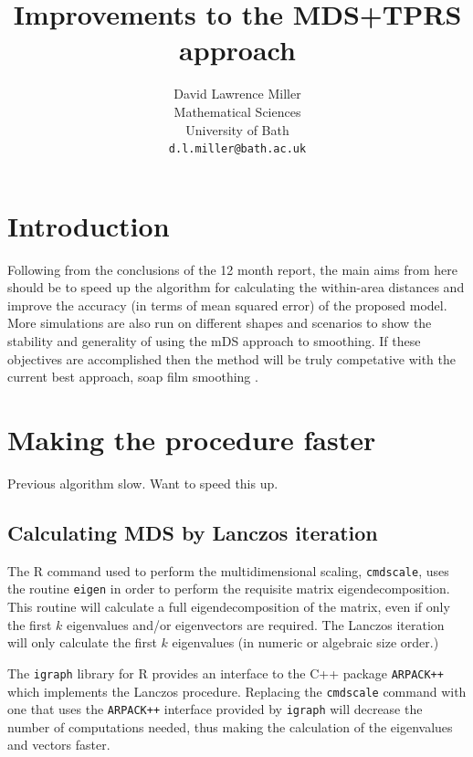 \documentclass[a4paper,10pt]{article}
\title{Improvements to the MDS+TPRS approach}
\author{David Lawrence Miller\\Mathematical Sciences\\University of Bath\\\texttt{d.l.miller@bath.ac.uk}}
\begin{document}
 
 
 
\newtheorem{thm}{Theorem}[section]
 
\newtheorem{defn}{Definition}[section]
 
\maketitle

\section{Introduction}

Following from the conclusions of the 12 month report, the main aims from here should be to speed up the algorithm for calculating the within-area distances and improve the accuracy (in terms of mean squared error) of the proposed model. More simulations are also run on different shapes and scenarios to show the stability and generality of using the mDS approach to smoothing. If these objectives are accomplished then the method will be truly competative with the current best approach, soap film smoothing \cite{soap}.


\section{Making the procedure faster}

Previous algorithm slow. Want to speed this up. 

\subsection{Calculating MDS by Lanczos iteration}

The \textsf{R} command used to perform the multidimensional scaling, \texttt{cmdscale}, uses the routine \texttt{eigen} in order to perform the requisite matrix eigendecomposition. This routine will calculate a full eigendecomposition of the matrix, even if only the first $k$ eigenvalues and/or eigenvectors are required. The Lanczos iteration will only calculate the first $k$ eigenvalues (in numeric or algebraic size order.)

The \texttt{igraph} library for \textsf{R} provides an interface to the C++ package \texttt{ARPACK++} which implements the Lanczos procedure. Replacing the \texttt{cmdscale} command with one that uses the \texttt{ARPACK++} interface provided by \texttt{igraph} will decrease the number of computations needed, thus making the calculation of the eigenvalues and vectors faster.
\end{document}
